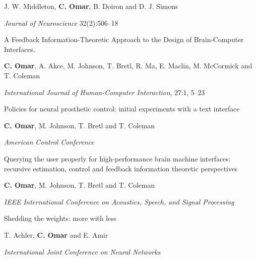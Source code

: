 \documentclass[10pt,letterpaper]{article}
\renewenvironment{itemize}{
  \begin{list}{}{
    \setlength{\leftmargin}{1.25em}
    \setlength{\itemsep}{0.25em}
    \setlength{\parskip}{0pt}
    \setlength{\parsep}{0.2em}
  }
}{
  \end{list}
}
\begin{document}
\begin{enumerate}[leftmargin=*, labelindent=6.5em, font=\bfseries]
        \begin{itemize}
          \item J. W. Middleton, \textbf{C. Omar}, B. Doiron and D. J. Simons
          \item \textit{Journal of Neuroscience} 32(2):506--18
        \end{itemize}
  \item[IJHCI 2011] A Feedback Information-Theoretic Approach to the Design of Brain-Computer Interfaces.
        \begin{itemize}
          \item  \textbf{C. Omar}, A. Akce, M. Johnson, T. Bretl, R. Ma, E. Maclin, M. McCormick and T. Coleman
          \item \textit{International Journal of Human-Computer Interaction}, 27:1, 5--23
        \end{itemize}
  \item[ACC 2008] Policies for neural prosthetic control: initial experiments with a text interface
        \begin{itemize}
          \item \textbf{C. Omar}, M. Johnson, T. Bretl and T. Coleman
          \item \textit{American Control Conference} 
        \end{itemize}
  \item[ICASSP 2008] Querying the user properly for high-performance brain machine interfaces: recursive estimation, control and feedback information theoretic perspectives
        \begin{itemize}
          \item \textbf{C. Omar}, M. Johnson, T. Bretl and T. Coleman
          \item \textit{IEEE International Conference on Acoustics, Speech, and Signal Processing}
        \end{itemize}
        \newpage
  \item[IJCNN 2008] Shedding the weights: more with less
        \begin{itemize}
          \item T. Achler, \textbf{C. Omar} and E. Amir
          \item \textit{International Joint Conference on Neural Networks}
        \end{itemize}

\end{enumerate}

\end{document}
